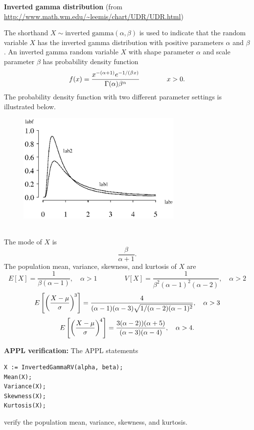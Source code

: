 \documentclass[12pt,fullpage]{article}
\begin{document}
\noindent
{\bf Inverted gamma distribution} (from \color{blue}\url{http://www.math.wm.edu/~leemis/chart/UDR/UDR.html}\color{black})

\noindent
The shorthand $X \sim \textrm{inverted gamma}(\alpha, \beta)$ is used to indicate that the
random variable $X$ has the inverted gamma distribution with positive parameters $\alpha$ and $\beta$.
An inverted gamma random variable $X$ with shape parameter $\alpha$ and scale parameter $\beta$ has probability density function 
$$
f(x) =  \frac{x ^ {-(\alpha + 1)} e ^ {-1 / (\beta \kern 0.04 em x)}}{\Gamma(\alpha) \beta ^ {\alpha}} \qquad \qquad x > 0.
$$
The probability density function with two different parameter settings is illustrated below. 
{\begin{figure}[h!]
\begin{center}
\includegraphics[width=3.2in]{InvertedgammaPlot.ps}
\end{center}
\end{figure}}\\
The mode of $X$ is
$$
\frac{\beta} {\alpha + 1}.
$$
The population mean, variance, skewness, and kurtosis of $X$ are
$$
E[X] = \frac{1} {\beta(\alpha - 1)}, \quad \alpha > 1 \qquad \qquad
V[X] = \frac{1} {\beta ^ {2}(\alpha - 1) ^ {2}(\alpha - 2)}, \quad \alpha > 2 
$$
$$
E\left[ \left( \frac{X - \mu} {\sigma} \right) ^ {\kern -0.08 em 3} \right] = \frac{4} {(\alpha - 1)(\alpha - 3) \sqrt{1 / (\alpha - 2)(\alpha - 1) ^ 2}}, \quad \alpha > 3  
$$
$$
E\left[ \left( \frac{X - \mu} {\sigma} \right) ^ {\kern -0.08 em 4} \right] = \frac{3 (\alpha - 2))(\alpha + 5)} {(\alpha - 3)(\alpha - 4)}, \quad \alpha > 4.
$$

\vspace{0.1in}

\noindent
{\bf APPL verification:}
The APPL statements
\begin{verbatim}
X := InvertedGammaRV(alpha, beta);
Mean(X);
Variance(X);
Skewness(X);
Kurtosis(X);
\end{verbatim}
verify the population mean, variance, skewness, and kurtosis.
\end{document}
